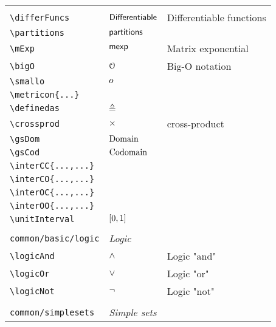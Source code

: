 \begin{longtable}{lll}
{{}%
}%
\\ 
 {\color[rgb]{0.5,0.5,0.5}\texttt{\textbackslash differFuncs}} & $\mathsf{Differentiable}$ &  Differentiable functions\\ 
 {\color[rgb]{0.5,0.5,0.5}\texttt{\textbackslash partitions}} & $\mathsf{partitions}$ & \\ 
 {\color[rgb]{0.5,0.5,0.5}\texttt{\textbackslash mExp}} & $\mathsf{mexp}$ &  Matrix exponential\\ 
 {\color[rgb]{0.5,0.5,0.5}\texttt{\textbackslash bigO}} & $\mathcal{O}$ &  Big-O notation\\ 
 {\color[rgb]{0.5,0.5,0.5}\texttt{\textbackslash smallo}} & $o$ & \\ 
 {\color[rgb]{0.5,0.5,0.5}\texttt{\textbackslash metricon\{...\}}} &  & \\ 
 {\color[rgb]{0.5,0.5,0.5}\texttt{\textbackslash definedas}} & $\mathrel{\triangleq}$ & \\ 
 {\color[rgb]{0.5,0.5,0.5}\texttt{\textbackslash crossprod}} & $\mathrel{\times}$ &  cross-product\\ 
 {\color[rgb]{0.5,0.5,0.5}\texttt{\textbackslash gsDom}} & $\text{Domain}$ &  \\ 
 {\color[rgb]{0.5,0.5,0.5}\texttt{\textbackslash gsCod}} & $\text{Codomain}$ &  \\ 
 {\color[rgb]{0.5,0.5,0.5}\texttt{\textbackslash interCC\{...,...\}}} &  & \\ 
 {\color[rgb]{0.5,0.5,0.5}\texttt{\textbackslash interCO\{...,...\}}} &  & \\ 
 {\color[rgb]{0.5,0.5,0.5}\texttt{\textbackslash interOC\{...,...\}}} &  & \\ 
 {\color[rgb]{0.5,0.5,0.5}\texttt{\textbackslash interOO\{...,...\}}} &  & \\ 
 {\color[rgb]{0.5,0.5,0.5}\texttt{\textbackslash unitInterval}} & $[0,1]$ & \\ 
  &  & \\ 
 {\color[rgb]{0.5,0.5,0.5}\texttt{common/basic/logic}} & \multicolumn{2}{l}{\emph{Logic}}\\ 
 \hline
{\color[rgb]{0.5,0.5,0.5}\texttt{\textbackslash logicAnd}} & $\wedge$ &  Logic "and"\\ 
 {\color[rgb]{0.5,0.5,0.5}\texttt{\textbackslash logicOr}} & $\vee$ &  Logic "or"\\ 
 {\color[rgb]{0.5,0.5,0.5}\texttt{\textbackslash logicNot}} & $\neg$ &  Logic "not"\\ 
  &  & \\ 
 {\color[rgb]{0.5,0.5,0.5}\texttt{common/simplesets}} & \multicolumn{2}{l}{\emph{Simple sets}}\\ 

\end{longtable}
